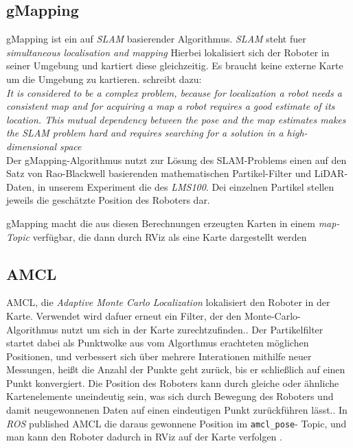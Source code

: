 \documentclass[11pt,a4paper]{article}
\begin{document}
\subsection*{gMapping}
gMapping ist ein auf \textit{SLAM} basierender Algorithmus. \textit{SLAM} steht fuer \textit{simultaneous localisation and mapping}\cite{website:mathworksSLAM}
Hierbei lokalisiert sich der Roboter in seiner Umgebung und kartiert diese gleichzeitig. Es braucht keine externe Karte um die Umgebung zu kartieren.
\cite{raoblackwellgmapping} schreibt dazu: \\
\textit{ It is
considered to be a complex problem, because for localization
a robot needs a consistent map and for acquiring a map a
robot requires a good estimate of its location. This mutual
dependency between the pose and the map estimates makes
the SLAM problem hard and requires searching for a solution
in a high-dimensional space} \\
Der gMapping-Algorithmus nutzt zur Lösung des SLAM-Problems einen auf den Satz von Rao-Blackwell basierenden mathematischen Partikel-Filter und LiDAR-Daten\cite{website:openslamgmapping},
in unserem Experiment die des \textit{LMS100}. Dei einzelnen Partikel stellen jeweils die geschätzte Position des Roboters dar. 

gMapping macht die aus diesen Berechnungen erzeugten Karten in einem \textit{map-Topic} verfügbar, die dann durch RViz als eine 
Karte dargestellt werden\cite{website:gmapping}

\subsection*{AMCL}
AMCL, die \textit{Adaptive Monte Carlo Localization} lokalisiert den Roboter in der Karte. Verwendet wird dafuer erneut ein 
Filter, der den Monte-Carlo-Algorithmus nutzt um sich in der Karte zurechtzufinden.\cite{website:oreillyamcl}. 
Der Partikelfilter startet dabei als Punktwolke aus vom Algorthmus erachteten möglichen Positionen, und verbessert sich über mehrere Interationen mithilfe neuer Messungen, 
heißt die Anzahl der Punkte geht zurück, bis er schließlich auf einen Punkt konvergiert. 
Die Position des Roboters kann durch gleiche oder ähnliche Kartenelemente uneindeutig sein, was sich durch Bewegung des Roboters und 
damit neugewonnenen Daten auf einen eindeutigen Punkt zurückführen lässt.\cite{fox1999monte}. In \textit{ROS} published AMCL die daraus gewonnene Position im \verb+amcl_pose+-
Topic, und man kann den Roboter dadurch in RViz auf der Karte verfolgen \cite{website:amcl}.
\end{document}
